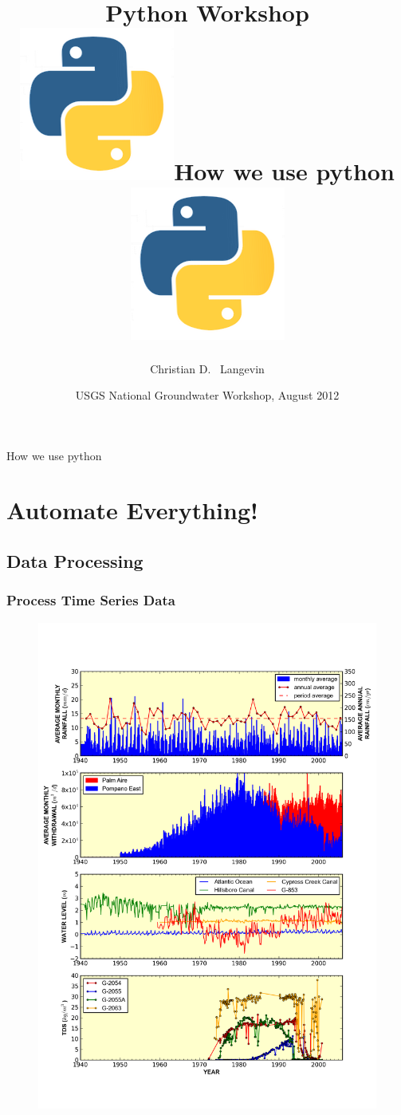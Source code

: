 \documentclass[t]{beamer}
\title[]{Python Workshop\\
 \includegraphics[scale=0.055]{figures/python-app.png}\hspace{5 pt}How we use python\hspace{5 pt}\includegraphics[scale=0.055]{figures/python-app.png} }
\author[Langevin] %
{Christian D. ~Langevin}
\institute[USGS] %
{
  U.S. Geological Survey\\
  Reston, Virgina USA
  }
\date[UQ12] %
{USGS National Groundwater Workshop, August 2012}
\begin{document}
\begin{frame}
  \titlepage
\end{frame}

\begin{frame}{How we use python}
\tableofcontents
\end{frame}


\section{Automate Everything!}
\subsection{Data Processing}

\begin{frame}[fragile]
\frametitle{Process Time Series Data}
  \begin{figure}[ht]
  \centering
         \includegraphics[scale=0.25]{figures/hydrotimeseries.png}
   \end{figure}
\end{frame}
\end{document}
